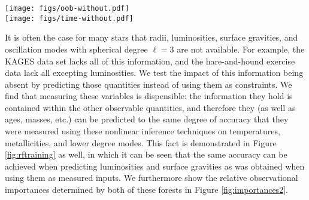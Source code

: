 \documentclass[manuscript]{aastex}
\begin{document}
\begin{figure*}
    \centering
    \texttt{[image: figs/oob-without.pdf]}\\
    \texttt{[image: figs/time-without.pdf]}\\
    \caption{Training accuracies (top) and times (bottom) of a random forest regressor plotted as a function of the number of trees in the forest. In less than one minute's time and using only a small number of trees, a machine learning algorithm can determine the relations that permit inference of stellar parameters from observations. It can also be seen that the training time is linear in the amount of decision trees used to fit the data. After the forest has about 16 trees, a regressor using a limited set of information (blue and red) does just as well as the regressor using all of the information (black). The performance of the regressor does not improve much after having grown about 32 trees. }
    \label{fig:rftraining}
\end{figure*}

It is often the case for many stars that radii, luminosities, surface gravities, and oscillation modes with spherical degree $\ell=3$ are not available. For example, the KAGES data set lacks all of this information, and the hare-and-hound exercise data lack all excepting luminosities. We test the impact of this information being absent by predicting those quantities instead of using them as constraints. We find that measuring these variables is dispensible: the information they hold is contained within the other observable quantities, and therefore they (as well as ages, masses, etc.) can be predicted to the same degree of accuracy that they were measured using these nonlinear inference techniques on temperatures, metallicities, and lower degree modes. This fact is demonstrated in Figure \ref{fig:rftraining} as well, in which it can be seen that the same accuracy can be achieved when predicting luminosities and surface gravities as was obtained when using them as measured inputs. We furthermore show the relative observational importances determined by both of these forests in Figure \ref{fig:importances2}. 
\end{document}
